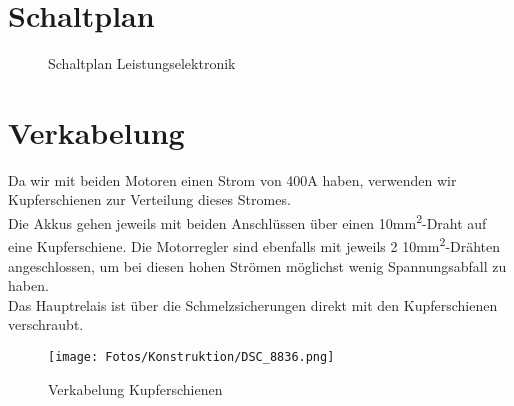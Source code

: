 \section{Schaltplan}
\begin{figure}[H]
    
    \caption{Schaltplan Leistungselektronik}
\end{figure}

\clearpage
\section{Verkabelung}
Da wir mit beiden Motoren einen Strom von 400A haben, verwenden wir Kupferschienen zur Verteilung dieses Stromes.\\
Die Akkus gehen jeweils mit beiden Anschlüssen über einen 10mm\textsuperscript{2}-Draht auf eine Kupferschiene. Die Motorregler sind ebenfalls mit jeweils 2 10mm\textsuperscript{2}-Drähten angeschlossen, um bei diesen hohen Strömen möglichst wenig Spannungsabfall zu haben.\\
Das Hauptrelais ist über die Schmelzsicherungen direkt mit den Kupferschienen verschraubt.
\begin{figure}[H]
    \texttt{[image: Fotos/Konstruktion/DSC\_8836.png]}
    \caption{Verkabelung Kupferschienen}
\end{figure}


\clearpage